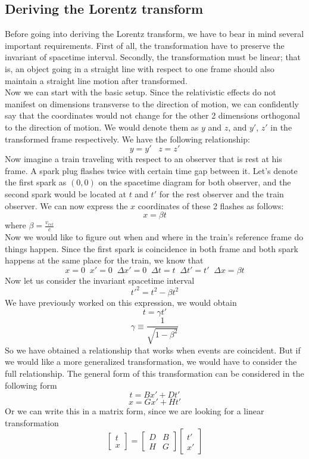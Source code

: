 \documentclass[12pt]{book}
\begin{document}
\subsection{Deriving the Lorentz transform}
Before going into deriving the Lorentz transform, we have to bear in mind several important requirements. First of all, the transformation have to preserve the invariant of spacetime interval. Secondly, the transformation must be linear; that is, an object going in a straight line with respect to one frame should also maintain a straight line motion after transformed. \\
\newline
Now we can start with the basic setup. Since the relativistic effects do not manifest on dimensions transverse to the direction of motion, we can confidently say that the coordinates would not change for the other 2 dimensions orthogonal to the direction of motion. We would denote them as $y$ and $z$, and $y'$, $z'$ in the transformed frame respectively. We have the following relationship:
\[
y=y' \;\;\; z=z'
\]
Now imagine a train traveling with respect to an observer that is rest at his frame. A spark plug flashes twice with certain time gap between it. Let's denote the first spark as $(0,0)$ on the spacetime diagram for both observer, and the second spark would be located at $t$ and $t'$ for the rest observer and the train observer. We can now express the $x$ coordinates of these 2 flashes as follows:
\[
x=\beta t
\]
where $\beta = \frac{v_{rel}}{c}$\\
\newline
Now we would like to figure out when and where in the train's reference frame do things happen. Since the first spark is coincidence in both frame and both spark happens at the same place for the train, we know that
\[
x=0 \;\; x'=0 \;\; \Delta x' = 0 \;\; \Delta t = t \;\; \Delta t' = t' \;\; \Delta x = \beta t
\]
Now let us consider the invariant spacetime interval
\[
t'^2=t^2-\beta t^2
\]
We have previously worked on this expression, we would obtain
\[
t=\gamma t'
\]
\[
\gamma \equiv \frac{1}{\sqrt{1-\beta ^2}}
\]
So we have obtained a relationship that works when events are coincident. But if we would like a more generalized transformation, we would have to consider the full relationship. The general form of this transformation can be considered in the following form
\[
t=Bx'+Dt'
\]
\[
x=Gx'+Ht'
\]
Or we can write this in a matrix form, since we are looking for a linear transformation
\[
\begin{bmatrix}
    t \\ x
\end{bmatrix}
=
\begin{bmatrix}
    D&B\\
    H&G
\end{bmatrix}
\begin{bmatrix}
    t'\\ x'
\end{bmatrix}
\]
\end{document}
